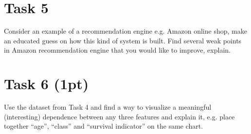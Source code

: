 \documentclass{article}
\begin{document}
\section*{Task 5}
Consider an example of a recommendation engine e.g. Amazon online shop, make an educated guess on how this kind of system is built. Find several weak points in Amazon recommendation engine that you would like to improve, explain.

\section*{Task 6 (1pt)}
Use the dataset from Task 4 and find a way to visualize a meaningful (interesting) dependence between any three features and explain it, e.g. place together ``age'', ``class'' and ``survival indicator'' on the same chart.
\end{document}
